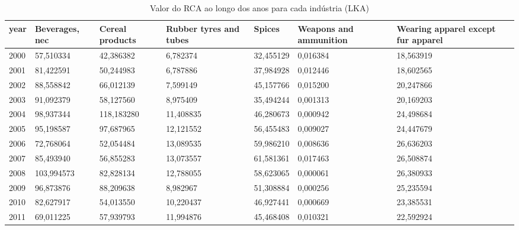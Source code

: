 \begin{table}
\centering
\caption{Valor do RCA ao longo dos anos para cada indústria (LKA)}
\begin{tabular}{p{1cm}p{2cm}p{2cm}p{2cm}p{2cm}p{2cm}p{2cm}}
\toprule
 year &  Beverages, nec &  Cereal products &  Rubber tyres and tubes &    Spices &  Weapons and ammunition &  Wearing apparel except fur apparel \\
\midrule
 2000 &       57,510334 &        42,386382 &                6,782374 & 32,455129 &                0,016384 &                           18,563919 \\
 2001 &       81,422591 &        50,244983 &                6,787886 & 37,984928 &                0,012446 &                           18,602565 \\
 2002 &       88,558842 &        66,012139 &                7,599149 & 45,157766 &                0,015200 &                           20,247866 \\
 2003 &       91,092379 &        58,127560 &                8,975409 & 35,494244 &                0,001313 &                           20,169203 \\
 2004 &       98,937344 &       118,183280 &               11,408835 & 46,280673 &                0,000942 &                           24,498684 \\
 2005 &       95,198587 &        97,687965 &               12,121552 & 56,455483 &                0,009027 &                           24,447679 \\
 2006 &       72,768064 &        52,054484 &               13,089535 & 59,986210 &                0,008636 &                           26,636203 \\
 2007 &       85,493940 &        56,855283 &               13,073557 & 61,581361 &                0,017463 &                           26,508874 \\
 2008 &      103,994573 &        82,828134 &               12,788055 & 58,623065 &                0,000061 &                           26,380933 \\
 2009 &       96,873876 &        88,209638 &                8,982967 & 51,308884 &                0,000256 &                           25,235594 \\
 2010 &       82,627917 &        54,013550 &               10,220437 & 46,927441 &                0,000669 &                           23,385531 \\
 2011 &       69,011225 &        57,939793 &               11,994876 & 45,468408 &                0,010321 &                           22,592924 \\

\end{tabular}
\end{table}

